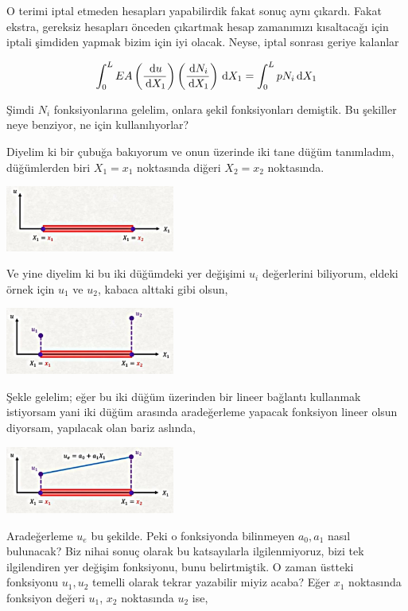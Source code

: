 \documentclass[12pt,fleqn]{article}\usepackage{../../common}
\begin{document}
O terimi iptal etmeden hesapları yapabilirdik fakat sonuç aynı çıkardı. Fakat
ekstra, gereksiz hesapları önceden çıkartmak hesap zamanımızı kısaltacağı için
iptali şimdiden yapmak bizim için iyi olacak. Neyse, iptal sonrası geriye
kalanlar

$$
\int_{0}^{L} EA
\left( \frac{\,\mathrm{d} u}{\,\mathrm{d} X_1} \right)
\left( \frac{\,\mathrm{d} N_i}{\,\mathrm{d} X_1} \right) \,\mathrm{d} X_1
= \int _{0}^{L} p N_i \,\mathrm{d} X_1 
$$

Şimdi $N_i$ fonksiyonlarına gelelim, onlara şekil fonksiyonları demiştik.
Bu şekiller neye benziyor, ne için kullanılıyorlar?

Diyelim ki bir çubuğa bakıyorum ve onun üzerinde iki tane düğüm tanımladım,
düğümlerden biri $X_1 = x_1$ noktasında diğeri $X_2 = x_2$ noktasında.

\includegraphics[width=15em]{compscieng_bpp45fem2_05.jpg}

Ve yine diyelim ki bu iki düğümdeki yer değişimi $u_i$ değerlerini biliyorum,
eldeki örnek için $u_1$ ve $u_2$, kabaca alttaki gibi olsun,

\includegraphics[width=15em]{compscieng_bpp45fem2_06.jpg}

Şekle gelelim; eğer bu iki düğüm üzerinden bir lineer bağlantı kullanmak
istiyorsam yani iki düğüm arasında aradeğerleme yapacak fonksiyon lineer olsun
diyorsam, yapılacak olan bariz aslında,

\includegraphics[width=15em]{compscieng_bpp45fem2_07.jpg}

Aradeğerleme $u_e$ bu şekilde. Peki o fonksiyonda bilinmeyen $a_0,a_1$ nasıl
bulunacak? Biz nihai sonuç olarak bu katsayılarla ilgilenmiyoruz, bizi tek
ilgilendiren yer değişim fonksiyonu, bunu belirtmiştik. O zaman üstteki
fonksiyonu $u_1,u_2$ temelli olarak tekrar yazabilir miyiz acaba? Eğer $x_1$
noktasında fonksiyon değeri $u_1$, $x_2$ noktasında $u_2$ ise,
\end{document}
